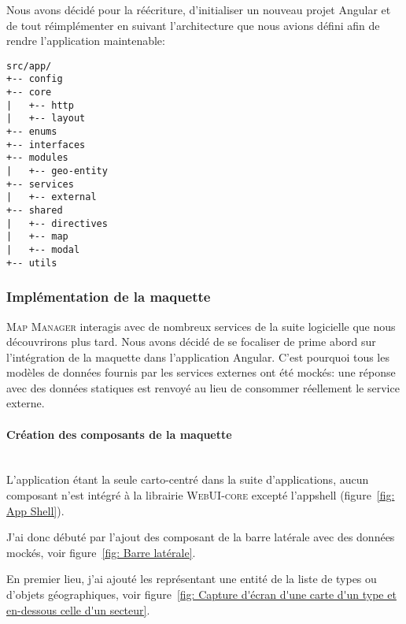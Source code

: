 \documentclass{rapportUHA40}
\begin{document}
Nous avons décidé pour la réécriture, d'initialiser un nouveau projet Angular
et de tout réimplémenter en suivant l'architecture que nous avions défini afin
de rendre l'application maintenable:

\newpage
\begin{verbatim}
src/app/
+-- config
+-- core
|   +-- http
|   +-- layout
+-- enums
+-- interfaces
+-- modules
|   +-- geo-entity
+-- services
|   +-- external
+-- shared
|   +-- directives
|   +-- map
|   +-- modal
+-- utils
\end{verbatim}

\subsubsection{Implémentation de la maquette}
\textsc{Map Manager} interagis avec de nombreux services de la suite logicielle
que nous découvrirons plus tard. Nous avons décidé de se focaliser de prime
abord sur l'intégration de la maquette dans l'application Angular. C'est
pourquoi tous les modèles de données fournis par les services externes ont été
mockés: une réponse  \fg{} avec des données statiques est renvoyé au
lieu de consommer réellement le service externe.

\paragraph{Création des composants de la maquette}\mbox{}\\
L'application étant la seule carto-centré dans la suite d'applications, aucun
composant n'est intégré à la librairie \textsc{WebUI-core} excepté
l'\gls{appshell} (figure~\ref{fig: App Shell}).

\newpage
J'ai donc débuté par l'ajout des composant de la barre latérale avec des
données mockés, voir figure~\ref{fig: Barre latérale}.


En premier lieu, j'ai ajouté les  \fg{} représentant une entité de la
liste de types ou d'objets géographiques, voir figure~\ref{fig: Capture d'écran
  d'une carte d'un type et en-dessous celle d'un secteur}.
\end{document}
